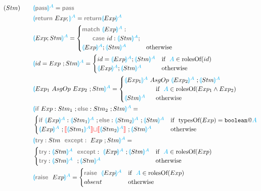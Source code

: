 \documentclass[11pt]{jarticle}
\newcommand{\projection}[2]{{\color{cyan}\llparenthesis}#1{\color{cyan}\rrparenthesis^#2}}
\newcommand{\gray}[1]{\textbf{\textsf{\color{Gray}#1}}}
\newcommand{\cyan}[1]{\color{cyan}#1}
\newcommand{\nl}[1]{{\color{red}{\llbracket}}#1{\color{red}{\rrbracket}}}
\begin{document}
\begin{alignat*}{2}
  &(Stm)~~~ &&\projection{\gray{pass}}{A} = \gray{pass}\\
  &&&\projection{\gray{return} ~ Exp;}{A} = \gray{return} \projection{Exp}{A}\\
  &&&\projection{Exp;Stm}{A} =
  \begin{cases}
    \gray{match} ~\projection{Exp}{A}:\\
    ~~~~~\gray{case} ~id: \projection{Stm}{A}; \\
    \projection{Exp}{A};\projection{Stm}{A} & \text{otherwise}\\
  \end{cases}\\
  &&& \projection{id = Exp~;Stm}{A} =
  \begin{cases}
    id = \projection{Exp}{A};\projection{Stm}{A} & \text{if}~~ {\color{cyan}A} \in \text{rolesOf}(id)\\
    \projection{Exp}{A};\projection{Stm}{A} & \text{otherwise}
  \end{cases}\\
  &&& \projection{Exp_1 ~AsgOp~ Exp_2 ~; Stm}{A}=
  \begin{cases}
    \projection{Exp_1}{A} ~AsgOp~ \projection{Exp_2}{A} ~; \projection{Stm}{A} \\
    ~~~~~~~~~~~~~~~\text{if}~~ {\cyan{A}} \in \text{rolesOf}(Exp_1 \wedge Exp_2) \\
    \projection{Stm}{A} ~~~~~\text{otherwise}
  \end{cases}\\
  &&&\projection{\gray{if}~Exp:Stm_1~;\gray{else}:Stm_2 ~;Stm}{A}=\\
  &&&
  \begin{cases}
    \gray{if}~\projection{Exp}{A} : \projection{Stm_1}{A} ~; \gray{else}:\projection{Stm_2}{A} ~;\projection{Stm}{A} & \text{if}~~ \text{typesOf}(Exp) = \texttt{boolean}\gray{@}\cyan{A}\\
    \projection{Exp}{A} ~; \nl{\projection{Stm_1}{A}} {\color{red}\sqcup} \nl{\projection{Stm_2}{A}} ~;\projection{Stm}{A} & \text{otherwise}
  \end{cases}\\
  &&&\projection{\gray{try}:Stm ~~ \gray{except}:~Exp~;Stm}{A} =\\
  &&&
  \begin{cases}
    \gray{try}:\projection{Stm}{A}~~\gray{except}:~ \projection{Exp}{A}~;\projection{Stm}{A} & \text{if}~~ {\cyan{A}} \in \text{rolesOf}(Exp)\\
    \gray{try}:\projection{Stm}{A}~~;\projection{Stm}{A} & \text{otherwise}
  \end{cases}\\
  &&&\projection{\gray{raise} ~~Exp}{A} = 
  \begin{cases}
    \gray{raise} ~~\projection{Exp}{A} & \text{if}~~{\cyan{A}} \in \text{rolesOf}(Exp)\\
    absent & \text{otherwise}
  \end{cases}
\end{alignat*}
\end{document}
